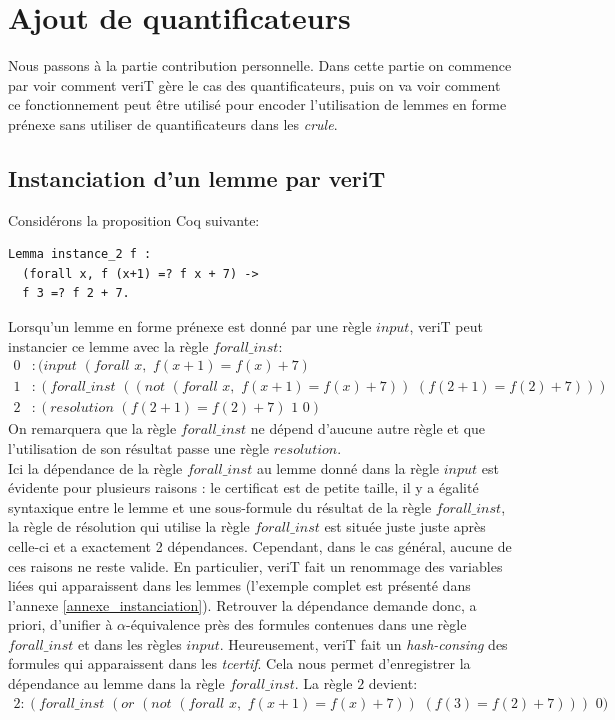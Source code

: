 \documentclass[11pt]{article}
\begin{document}
\newpage
\section{Ajout de quantificateurs}

Nous passons à la partie contribution personnelle. Dans cette partie on commence par voir comment veriT gère le cas des quantificateurs, puis on va voir comment ce fonctionnement peut être utilisé pour encoder l'utilisation de lemmes en forme prénexe sans utiliser de quantificateurs dans les \textit{crule}.

\subsection{Instanciation d'un lemme par veriT}

Considérons la proposition Coq suivante: 

\begin{lstlisting}[frame=single]
Lemma instance_2 f : 
  (forall x, f (x+1) =? f x + 7) ->
  f 3 =? f 2 + 7.
\end{lstlisting}

Lorsqu'un lemme en forme prénexe est donné par une règle $input$, veriT peut instancier ce lemme avec la règle $forall\_inst$: 
\begin{align*}
0&:(input \,\,(forall\,\, x,\,\, f (x+1) = f(x)+7) \\
1&:(forall\_inst \,\,((not \,\,(forall\,\, x, \,\,f (x+1) = f(x)+7)) \,\,(f (2+1) = f(2)+7)) )\\
2&:(resolution  \,\, (f (2+1) = f(2)+7) \,\,1 \,\,0) 
\end{align*}
On remarquera que la règle $forall\_inst$ ne dépend d'aucune autre règle et que l'utilisation de son résultat passe une règle $resolution$.\\

Ici la dépendance de la règle $forall\_inst$ au lemme donné dans la règle $input$ est évidente pour plusieurs raisons : le certificat est de petite taille, il y a égalité syntaxique entre le lemme et une sous-formule du résultat de la règle $forall\_inst$, la règle de résolution qui utilise la règle $forall\_inst$ est située juste juste après celle-ci et a exactement 2 dépendances. Cependant, dans le cas général, aucune de ces raisons ne reste valide. En particulier, veriT fait un renommage des variables liées qui apparaissent dans les lemmes (l'exemple complet est présenté dans l'annexe \ref{annexe_instanciation}). Retrouver la dépendance demande donc, a priori, d'unifier à $\alpha$-équivalence près des formules contenues dans une règle $forall\_inst$ et dans les règles $input$. Heureusement, veriT fait un \textit{hash-consing} des formules qui apparaissent dans les \textit{tcertif}. Cela nous permet d'enregistrer la dépendance au lemme dans la règle $forall\_inst$. La règle $2$ devient: 
\begin{align*}
2:(forall\_inst \,\, (or\,\, (not \,\,(forall \,\,x, \,\,f (x+1) = f(x)+7)) \,\,(f (3) = f(2)+7))) \,\,0) 
\end{align*}
\end{document}
